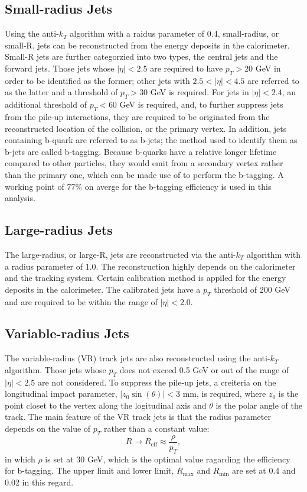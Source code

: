 \documentclass[class=NCU_thesis, crop=false]{standalone}
\begin{document}
	\subsection{Small-radius Jets}
		Using the anti-$k_T$ algorithm with a raidus parameter of 0.4, small-radius, or small-R, jets can be reconstructed from the energy deposits in the calorimeter. Small-R jets are further categorzied into two types, the central jets and the forward jets. Those jets whose $\lvert \eta \rvert < 2.5$ are required to have $p_T > 20$ GeV in order to be identified as the former; other jets with $2.5 < \lvert \eta \rvert < 4.5$ are referred to as the latter and a threshold of $p_T > 30$ GeV is required. For jets in $\lvert \eta \rvert < 2.4$, an additional threshold of $p_T < 60$ GeV is required, and, to further suppress jets from the pile-up interactions, they are required to be originated from the reconstructed location of the collision, or the primary vertex. In addition, jets containing b-quark are referred to as b-jets; the method used to identify them as b-jets are called b-tagging. Because b-quarks have a relative longer lifetime compared to other particles, they would emit from a secondary vertex rather than the primary one, which can be made use of to perform the b-tagging. A working point of 77\% on averge for the b-tagging efficiency is used in this analysis.
	
	\subsection{Large-radius Jets}
		The large-radius, or large-R, jets are reconstructed via the anti-$k_T$ algorithm with a radius parameter of 1.0. The reconstruction highly depends on the calorimeter and the tracking system. Certain calibration method is appiled for the energy deposits in the calorimeter. The calibrated jets have a $p_T$ threshold of 200 GeV and are required to be within the range of $\lvert \eta \rvert < 2.0$.
	
	\subsection{Variable-radius Jets}
		The variable-radius (VR) track jets are also reconstructed using the anti-$k_T$ algorithm. Those jets whose $p_T$ does not exceed 0.5 GeV or out of the range of $\lvert \eta \rvert < 2.5$ are not considered. To suppress the pile-up jets, a creiteria on the longitudinal impact parameter, $\lvert z_0 \sin(\theta) \rvert < 3$ mm, is required, where $z_0$ is the point closet to the vertex along the logitudinal axis and $\theta$ is the polar angle of the track. The main feature of the VR track jets is that the radius parameter depends on the value of $p_T$ rather than a constant value:
		\begin{equation}
			R \rightarrow R_{\mathrm{eff}} \approx \frac{\rho}{p_T},
		\end{equation}
		in which $\rho$ is set at 30 GeV, which is the optimal value ragarding the efficiency for b-tagging. The upper limit and lower limit, $R_{\mathrm{max}}$ and $R_{\mathrm{min}}$ are set at 0.4 and 0.02 in this regard.
	
\end{document}
